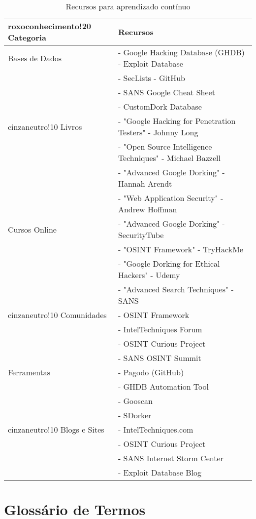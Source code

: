 \documentclass[12pt,a4paper]{book}
\begin{document}
\begin{table}[h]
\centering
\begin{tabular}{|p{4cm}|p{11cm}|}
\hline
{roxoconhecimento!20} \textbf{Categoria} & \textbf{Recursos} \\
\hline
Bases de Dados & - Google Hacking Database (GHDB) - Exploit Database \\
& - SecLists - GitHub \\
& - SANS Google Cheat Sheet \\
& - CustomDork Database \\
\hline
{cinzaneutro!10} Livros & - "Google Hacking for Penetration Testers" - Johnny Long \\
& - "Open Source Intelligence Techniques" - Michael Bazzell \\
& - "Advanced Google Dorking" - Hannah Arendt \\
& - "Web Application Security" - Andrew Hoffman \\
\hline
Cursos Online & - "Advanced Google Dorking" - SecurityTube \\
& - "OSINT Framework" - TryHackMe \\
& - "Google Dorking for Ethical Hackers" - Udemy \\
& - "Advanced Search Techniques" - SANS \\
\hline
{cinzaneutro!10} Comunidades & - OSINT Framework \\
& - IntelTechniques Forum \\
& - OSINT Curious Project \\
& - SANS OSINT Summit \\
\hline
Ferramentas & - Pagodo (GitHub) \\
& - GHDB Automation Tool \\
& - Gooscan \\
& - SDorker \\
\hline
{cinzaneutro!10} Blogs e Sites & - IntelTechniques.com \\
& - OSINT Curious Project \\
& - SANS Internet Storm Center \\
& - Exploit Database Blog \\
\hline
\end{tabular}
\caption{Recursos para aprendizado contínuo}
\end{table}

\section{Glossário de Termos}
\end{document}
